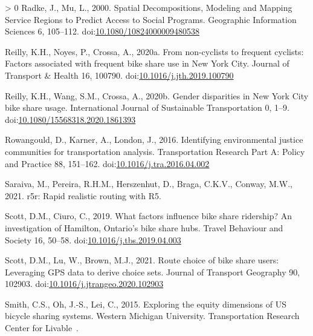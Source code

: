 \documentclass[]{elsarticle} %
\newlength{\cslhangindent}
\newenvironment{CSLReferences}[3] %
 {%
  \setlength{\parindent}{0pt}
  \ifodd #1 \everypar{\setlength{\hangindent}{\cslhangindent}}\ignorespaces\fi
  \ifnum #2 > 0
  \setlength{\parskip}{#2\baselineskip}
  \fi
 }%
 {}
\begin{document}
\begin{CSLReferences}{1}{0}
\leavevmode\hypertarget{ref-radkeSpatialDecompositionsModeling2000}{}%
Radke, J., Mu, L., 2000. Spatial {Decompositions}, {Modeling} and
{Mapping Service Regions} to {Predict Access} to {Social Programs}.
Geographic Information Sciences 6, 105--112.
doi:\href{https://doi.org/10.1080/10824000009480538}{10.1080/10824000009480538}

\leavevmode\hypertarget{ref-reillyNoncyclistsFrequentCyclists2020}{}%
Reilly, K.H., Noyes, P., Crossa, A., 2020a. From non-cyclists to
frequent cyclists: {Factors} associated with frequent bike share use in
{New York City}. Journal of Transport \& Health 16, 100790.
doi:\href{https://doi.org/10.1016/j.jth.2019.100790}{10.1016/j.jth.2019.100790}

\leavevmode\hypertarget{ref-reillyGenderDisparitiesNew2020}{}%
Reilly, K.H., Wang, S.M., Crossa, A., 2020b. Gender disparities in {New
York City} bike share usage. International Journal of Sustainable
Transportation 0, 1--9.
doi:\href{https://doi.org/10.1080/15568318.2020.1861393}{10.1080/15568318.2020.1861393}

\leavevmode\hypertarget{ref-rowangouldIdentifyingEnvironmentalJustice2016}{}%
Rowangould, D., Karner, A., London, J., 2016. Identifying environmental
justice communities for transportation analysis. Transportation Research
Part A: Policy and Practice 88, 151--162.
doi:\href{https://doi.org/10.1016/j.tra.2016.04.002}{10.1016/j.tra.2016.04.002}

\leavevmode\hypertarget{ref-R-r5r}{}%
Saraiva, M., Pereira, R.H.M., Herszenhut, D., Braga, C.K.V., Conway,
M.W., 2021. r5r: Rapid realistic routing with R5.

\leavevmode\hypertarget{ref-scottWhatFactorsInfluence2019}{}%
Scott, D.M., Ciuro, C., 2019. What factors influence bike share
ridership? {An} investigation of {Hamilton}, {Ontario}'s bike share
hubs. Travel Behaviour and Society 16, 50--58.
doi:\href{https://doi.org/10.1016/j.tbs.2019.04.003}{10.1016/j.tbs.2019.04.003}

\leavevmode\hypertarget{ref-scottRouteChoiceBike2021}{}%
Scott, D.M., Lu, W., Brown, M.J., 2021. Route choice of bike share
users: Leveraging GPS data to derive choice sets. Journal of Transport
Geography 90, 102903.
doi:\href{https://doi.org/10.1016/j.jtrangeo.2020.102903}{10.1016/j.jtrangeo.2020.102903}

\leavevmode\hypertarget{ref-smith2015exploring}{}%
Smith, C.S., Oh, J.-S., Lei, C., 2015. Exploring the equity dimensions
of US bicycle sharing systems. Western Michigan University.
Transportation Research Center for Livable~.


\end{CSLReferences}
\end{document}
